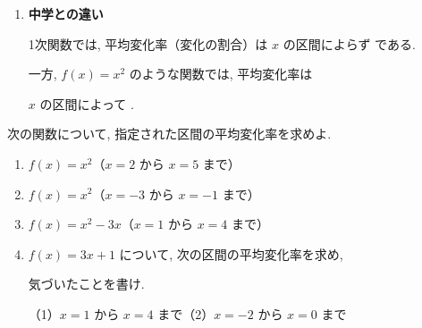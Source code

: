 \documentclass[14pt]{jsarticle}
\begin{document}
\begin{summarybox}
\begin{enumerate}[label=\textbf{\arabic*}, leftmargin=1.5zw, itemsep=0.5em]
    \item \textbf{中学との違い}\par
      1次関数では, 平均変化率（変化の割合）は $x$ の区間によらず
       である.\par
      一方, $f(x) = x^2$ のような関数では, 平均変化率は\par
      $x$ の区間によって .
  \end{enumerate}
\end{summarybox}

\vfill
\nextpage

次の関数について, 指定された区間の平均変化率を求めよ.

\begin{enumerate}[label=\textbf{問\arabic*}, leftmargin=3zw, itemsep=0.8em]
  \item $f(x) = x^2$\quad （$x = 2$ から $x = 5$ まで）

  \item $f(x) = x^2$\quad （$x = -3$ から $x = -1$ まで）

  \item $f(x) = x^2 - 3x$\quad （$x = 1$ から $x = 4$ まで）

  \item $f(x) = 3x + 1$ について, 次の区間の平均変化率を求め,\par
    気づいたことを書け.\par
    （1）$x = 1$ から $x = 4$ まで\quad （2）$x = -2$ から $x = 0$ まで
\end{enumerate}

\vfill
{}
\end{document}
